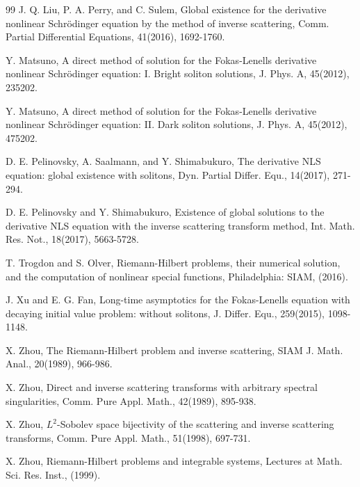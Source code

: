 \documentclass[preprint,compress,12pt]{elsarticle}
\numberwithin{equation}{section}
\begin{document}
\begin{thebibliography}{99}
J. Q. Liu, P. A. Perry, and C. Sulem, Global existence for the derivative nonlinear Schr\"{o}dinger equation by the method of inverse scattering, Comm. Partial Differential Equations, 41(2016), 1692-1760.

Y. Matsuno, A direct method of solution for the Fokas-Lenells derivative nonlinear Schr\"{o}dinger equation: I. Bright soliton solutions, J. Phys. A, 45(2012), 235202.

Y. Matsuno, A direct method of solution for the Fokas-Lenells derivative nonlinear Schr\"{o}dinger equation: II. Dark soliton solutions, J. Phys. A, 45(2012), 475202.

D. E. Pelinovsky, A. Saalmann, and Y. Shimabukuro, The derivative NLS equation: global existence with solitons, Dyn. Partial Differ. Equ., 14(2017), 271-294.

D. E. Pelinovsky and Y. Shimabukuro, Existence of global solutions to the derivative NLS equation with the inverse scattering transform method,
Int. Math. Res. Not., 18(2017), 5663-5728.

T. Trogdon and S. Olver, Riemann-Hilbert problems, their numerical solution, and the computation of nonlinear special functions, Philadelphia: SIAM, (2016).

J. Xu and E. G. Fan, Long-time asymptotics for the Fokas-Lenells equation with decaying initial value problem: without solitons, J. Differ. Equ., 259(2015), 1098-1148.

X. Zhou, The Riemann-Hilbert problem and inverse scattering, SIAM J. Math. Anal., 20(1989), 966-986.

X. Zhou, Direct and inverse scattering transforms with arbitrary spectral singularities, Comm. Pure Appl. Math.,
42(1989), 895-938.

X. Zhou, $L^{2}$-Sobolev space bijectivity of the scattering and inverse scattering transforms, Comm. Pure Appl. Math., 51(1998), 697-731.

X. Zhou, Riemann-Hilbert problems and integrable systems, Lectures at Math. Sci. Res. Inst., (1999).









    \end{thebibliography}
\end{document}
